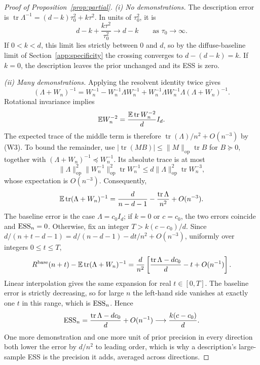 \begin{proof}[Proof of Proposition~\ref{prop:partial}]
\emph{(i) No demonstrations.}
The description error is $\operatorname{tr}\Lambda^{-1}=(d-k)\tau_0^2+k\tau^2$. In units of $\tau_0^2$, it is
\[
d-k+\frac{k\tau^2}{\tau_0^2}\longrightarrow d-k
\qquad\text{as }\tau_0\to\infty.
\]
If $0<k<d$, this limit lies strictly between $0$ and $d$, so by the diffuse-baseline limit of Section~\ref{app:specificity} the crossing converges to $d-(d-k)=k$. If $k=0$, the description leaves the prior unchanged and its ESS is zero.

\emph{(ii) Many demonstrations.}
Applying the resolvent identity twice gives
\[
(\Lambda+W_n)^{-1}
=W_n^{-1}-W_n^{-1}\Lambda W_n^{-1}
+W_n^{-1}\Lambda W_n^{-1}\Lambda(\Lambda+W_n)^{-1}.
\]
Rotational invariance implies
\[
\mathbb{E} W_n^{-2}=\frac{\mathbb{E}\operatorname{tr}W_n^{-2}}{d}I_d.
\]
The expected trace of the middle term is therefore
$\operatorname{tr}(\Lambda)/n^2+O(n^{-3})$ by (W3). To bound the remainder, use $|\operatorname{tr}(MB)|\le\|M\|_{\mathrm{op}}\operatorname{tr}B$ for $B\succeq0$, together with $(\Lambda+W_n)^{-1}\preceq W_n^{-1}$. Its absolute trace is at most
\[
\|\Lambda\|_{\mathrm{op}}^2\|W_n^{-1}\|_{\mathrm{op}}^2\operatorname{tr}W_n^{-1}
\le d\|\Lambda\|_{\mathrm{op}}^2\operatorname{tr}W_n^{-3},
\]
whose expectation is $O(n^{-3})$. Consequently,
\[
\mathbb{E}\operatorname{tr}(\Lambda+W_n)^{-1}
=\frac{d}{n-d-1}-\frac{\operatorname{tr}\Lambda}{n^2}+O(n^{-3}).
\]
The baseline error is the case $\Lambda=c_0I_d$; if $k=0$ or $c=c_0$, the two errors coincide and $\mathrm{ESS}_n=0$. Otherwise, fix an integer $T>k(c-c_0)/d$. Since $d/(n+t-d-1)=d/(n-d-1)-dt/n^2+O(n^{-3})$, uniformly over integers $0\le t\le T$,
\[
R^{\mathrm{base}}(n+t)-\mathbb{E}\operatorname{tr}(\Lambda+W_n)^{-1}
=\frac{d}{n^2}\left[\frac{\operatorname{tr}\Lambda-dc_0}{d}-t+O(n^{-1})\right].
\]
Linear interpolation gives the same expansion for real $t\in[0,T]$. The baseline error is strictly decreasing, so for large $n$ the left-hand side vanishes at exactly one $t$ in this range, which is $\mathrm{ESS}_n$. Hence
\[
\mathrm{ESS}_n=\frac{\operatorname{tr}\Lambda-dc_0}{d}+O(n^{-1})
\longrightarrow\frac{k(c-c_0)}{d}.
\]
One more demonstration and one more unit of prior precision in every direction both lower the error by $d/n^2$ to leading order, which is why a description's large-sample ESS is the precision it adds, averaged across directions.
\end{proof}
